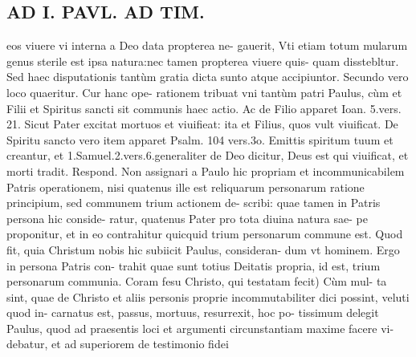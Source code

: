 \documentclass{article}
\begin{document}
\begin{pages}
\section*{AD I. PAVL. AD TIM. }
\marginpar{[ p.RIE. ]}\pstart eos viuere vi interna a Deo data propterea ne- gauerit, Vti etiam totum mularum genus sterile est ipsa natura:nec tamen propterea viuere quis- quam disstebltur. Sed haec disputationis tantùm gratia dicta sunto atque accipiuntor.  \pend\pstart Secundo vero loco quaeritur. Cur hanc ope- rationem tribuat vni tantùm patri Paulus, cùm et Filii et Spiritus sancti sit communis haec actio. Ac de Filio apparet Ioan. 5.vers. 21. Sicut Pater excitat mortuos et viuifieat: ita et Filius, quos vult viuificat. De Spiritu sancto vero item apparet Psalm. 104 vers.3o. Emittis spiritum tuum et creantur, et 1.Samuel.2.vers.6.generaliter de Deo dicitur, Deus est qui viuificat, et morti tradit. Respond. Non assignari a Paulo hic propriam et incommunicabilem Patris operationem, nisi quatenus ille est reliquarum personarum ratione principium, sed communem trium actionem de- scribi: quae tamen in Patris persona hic conside- ratur, quatenus Pater pro tota diuina natura sae- pe proponitur, et in eo contrahitur quicquid trium personarum commune est. Quod fit, quia Christum nobis hic subiicit Paulus, consideran- dum vt hominem. Ergo in persona Patris con- trahit quae sunt totius Deitatis propria, id est, trium personarum communia. Coram fesu Christo, qui testatam fecit) Cùm mul- ta sint, quae de Christo et aliis personis proprie incommutabiliter dici possint, veluti quod in- carnatus est, passus, mortuus, resurrexit, hoc po- tissimum delegit Paulus, quod ad praesentis loci et argumenti circunstantiam maxime facere vi- debatur, et ad superiorem de testimonio fidei  \pend

\end{pages}
\end{document}
